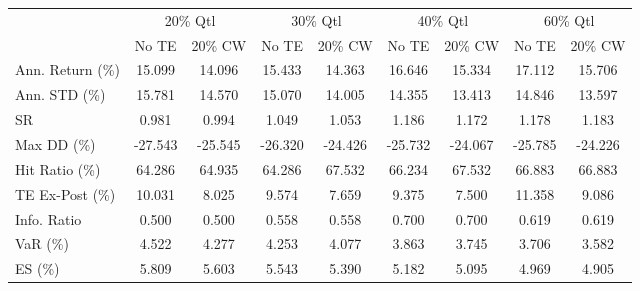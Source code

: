 \begin{tabular}{lcccccccc}
\toprule
{} & \multicolumn{2}{c}{20\% Qtl} & \multicolumn{2}{c}{30\% Qtl} & \multicolumn{2}{c}{40\% Qtl} & \multicolumn{2}{c}{60\% Qtl} \\
{} &   No TE &  20\% CW &   No TE &  20\% CW &   No TE &  20\% CW &   No TE &  20\% CW \\
\midrule
Ann. Return (\%) &  15.099 &  14.096 &  15.433 &  14.363 &  16.646 &  15.334 &  17.112 &  15.706 \\
Ann. STD (\%)    &  15.781 &  14.570 &  15.070 &  14.005 &  14.355 &  13.413 &  14.846 &  13.597 \\
SR              &   0.981 &   0.994 &   1.049 &   1.053 &   1.186 &   1.172 &   1.178 &   1.183 \\
Max DD (\%)      & -27.543 & -25.545 & -26.320 & -24.426 & -25.732 & -24.067 & -25.785 & -24.226 \\
Hit Ratio (\%)   &  64.286 &  64.935 &  64.286 &  67.532 &  66.234 &  67.532 &  66.883 &  66.883 \\
TE Ex-Post (\%)  &  10.031 &   8.025 &   9.574 &   7.659 &   9.375 &   7.500 &  11.358 &   9.086 \\
Info. Ratio     &   0.500 &   0.500 &   0.558 &   0.558 &   0.700 &   0.700 &   0.619 &   0.619 \\
VaR (\%)         &   4.522 &   4.277 &   4.253 &   4.077 &   3.863 &   3.745 &   3.706 &   3.582 \\
ES (\%)          &   5.809 &   5.603 &   5.543 &   5.390 &   5.182 &   5.095 &   4.969 &   4.905 \\
\bottomrule
\end{tabular}
